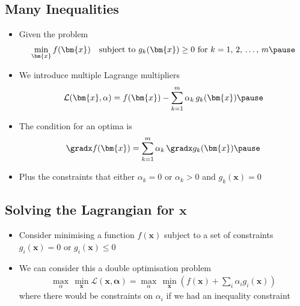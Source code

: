 \begin{slide}
\section[-2]{Many Inequalities}

\begin{PauseHighLight}
  \begin{itemize}
  \item Given the problem
    \begin{align*}
      \min_{\bm{x}} f(\bm{x}) \quad \mbox{subject to $g_k(\bm{x})\geq 0$ for
      $k=1,\,2,\,\ldots,\,m$}\pause
    \end{align*}
  \item We introduce multiple Lagrange multipliers
    \begin{align*}
      \mathcal{L}(\bm{x},\alpha) = f(\bm{x}) - \sum_{k=1}^m \alpha_k\,
      g_k(\bm{x})\pause 
    \end{align*}
  \item The condition for an optima is
    \begin{align*}
      \gradx f(\bm{x}) = \sum_{k=1}^m  \alpha_k \, \gradx g_k(\bm{x})\pause
    \end{align*}
  \item Plus the constraints that either $\alpha_k=0$ or $\alpha_k>0$ and
    $g_k(\bm{x})=0$\pause
  \end{itemize}
\end{PauseHighLight}

\end{slide}


\Outline %

\begin{slide}
\section{Solving the Lagrangian for $\bm{x}$}

\begin{PauseHighLight}
  \begin{itemize}
  \item Consider minimising a function $f(\bm{x})$ subject to a set of
    constraints $g_i(\bm{x})=0$ or $g_i(\bm{x})\leq 0$\pause
  \item We can consider this a double optimisation problem
    \begin{align*}
      \max_\alpha \, \min_{\bm{x}} \mathcal{L}(\bm{x},\bm{\alpha})
      = \max_\alpha \, \min_{\bm{x}} \left( f(\bm{x}) + \sum_i \alpha_i
      g_i(\bm{x}) \right)
    \end{align*}
    where there would be constraints on $\alpha_i$ if we had an
    inequality constraint\pause
  \end{itemize}
\end{PauseHighLight}

\end{slide}

